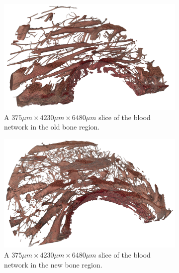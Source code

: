 \begin{figure}
    \centering
    \begin{subfigure}[b]{\linewidth}
    \centering
        \includegraphics[width=.7\linewidth]{figures/blood_old_bone_100.png}
        \caption{A $375\mu m \times 4230\mu m \times 6480\mu m$ slice of the blood network in the old bone region.}
        \label{fig:blood-old-slice}
    \end{subfigure}
    \begin{subfigure}[b]{\linewidth}
    \centering      
        \includegraphics[width=.7\linewidth]{figures/blood_new_bone_100.png}
        \caption{A $375\mu m \times 4230\mu m \times 6480\mu m$ slice of the blood network in the new bone region.}
        \label{fig:blood-new-slice}
    \end{subfigure}
    \begin{subfigure}[b]{.48\linewidth}
    \centering      

\end{subfigure}
\end{figure}
